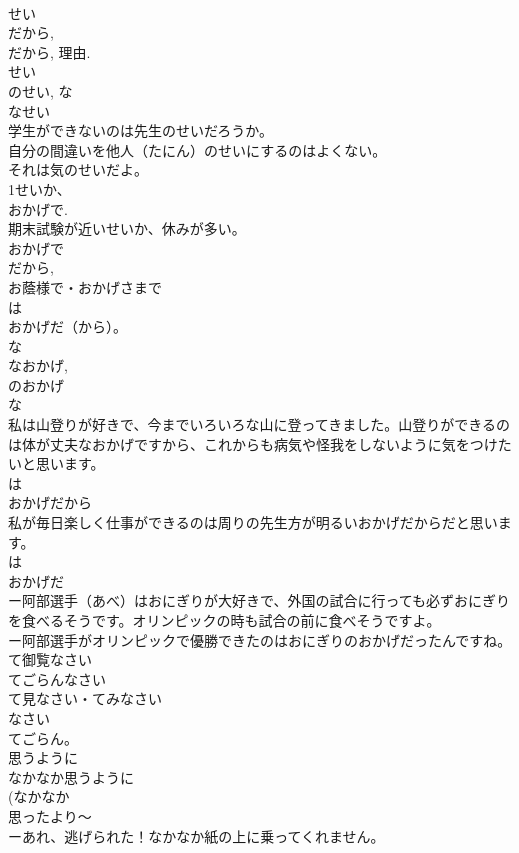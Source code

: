 \documentclass[8pt]{extreport}
\begin{document}
\begin{CJK}{UTF8}{min}
\\	せい
\\	だから, 
\\	だから, 理由.
\\	せい
\\	のせい, な
\\	なせい
\\	学生ができないのは先生のせいだろうか。
\\	自分の間違いを他人（たにん）のせいにするのはよくない。
\\	それは気のせいだよ。
\\	1せいか、
\\	おかげで.
\\	期末試験が近いせいか、休みが多い。
\\	おかげで
\\	だから, 
\\	お蔭様で・おかげさまで 
\\	は
\\	おかげだ（から）。
\\	な
\\	なおかげ, 
\\	のおかげ
\\	な
\\	私は山登りが好きで、今までいろいろな山に登ってきました。山登りができるのは体が丈夫なおかげですから、これからも病気や怪我をしないように気をつけたいと思います。
\\	は
\\	おかげだから 
\\	私が毎日楽しく仕事ができるのは周りの先生方が明るいおかげだからだと思います。
\\	は
\\	おかげだ 
\\	ー阿部選手（あべ）はおにぎりが大好きで、外国の試合に行っても必ずおにぎりを食べるそうです。オリンピックの時も試合の前に食べそうですよ。
\\	ー阿部選手がオリンピックで優勝できたのはおにぎりのおかげだったんですね。
\\	て御覧なさい
\\	てごらんなさい
\\	て見なさい・てみなさい
\\	なさい 
\\	てごらん。 
\\	思うように
\\	なかなか思うように
\\	(なかなか 
\\	思ったより～
\\	ーあれ、逃げられた！なかなか紙の上に乗ってくれません。

\end{CJK}
\end{document}
